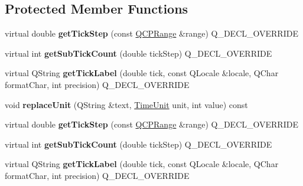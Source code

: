 \subsection*{Protected Member Functions}
\begin{DoxyCompactItemize}
\item 
virtual double {\bfseries get\+Tick\+Step} (const \hyperlink{class_q_c_p_range}{Q\+C\+P\+Range} \&range) Q\+\_\+\+D\+E\+C\+L\+\_\+\+O\+V\+E\+R\+R\+I\+DE\hypertarget{class_q_c_p_axis_ticker_time_a5615064642090fe193797caea8b98cb4}{}\label{class_q_c_p_axis_ticker_time_a5615064642090fe193797caea8b98cb4}

\item 
virtual int {\bfseries get\+Sub\+Tick\+Count} (double tick\+Step) Q\+\_\+\+D\+E\+C\+L\+\_\+\+O\+V\+E\+R\+R\+I\+DE\hypertarget{class_q_c_p_axis_ticker_time_acace84c46598176aa53837e147595471}{}\label{class_q_c_p_axis_ticker_time_acace84c46598176aa53837e147595471}

\item 
virtual Q\+String {\bfseries get\+Tick\+Label} (double tick, const Q\+Locale \&locale, Q\+Char format\+Char, int precision) Q\+\_\+\+D\+E\+C\+L\+\_\+\+O\+V\+E\+R\+R\+I\+DE\hypertarget{class_q_c_p_axis_ticker_time_a046eb771bdf2a959f570db542b3a0be6}{}\label{class_q_c_p_axis_ticker_time_a046eb771bdf2a959f570db542b3a0be6}

\item 
void {\bfseries replace\+Unit} (Q\+String \&text, \hyperlink{class_q_c_p_axis_ticker_time_a5c48ded8c6d3a1aca9b68219469fea3e}{Time\+Unit} unit, int value) const \hypertarget{class_q_c_p_axis_ticker_time_a71896eb1fd7eafaba911245c048857e1}{}\label{class_q_c_p_axis_ticker_time_a71896eb1fd7eafaba911245c048857e1}

\item 
virtual double {\bfseries get\+Tick\+Step} (const \hyperlink{class_q_c_p_range}{Q\+C\+P\+Range} \&range) Q\+\_\+\+D\+E\+C\+L\+\_\+\+O\+V\+E\+R\+R\+I\+DE\hypertarget{class_q_c_p_axis_ticker_time_a38462cd47fdca21bf6c1938eaad93c0c}{}\label{class_q_c_p_axis_ticker_time_a38462cd47fdca21bf6c1938eaad93c0c}

\item 
virtual int {\bfseries get\+Sub\+Tick\+Count} (double tick\+Step) Q\+\_\+\+D\+E\+C\+L\+\_\+\+O\+V\+E\+R\+R\+I\+DE\hypertarget{class_q_c_p_axis_ticker_time_a08b898076e82b8ee6adcc027e1db92a7}{}\label{class_q_c_p_axis_ticker_time_a08b898076e82b8ee6adcc027e1db92a7}

\item 
virtual Q\+String {\bfseries get\+Tick\+Label} (double tick, const Q\+Locale \&locale, Q\+Char format\+Char, int precision) Q\+\_\+\+D\+E\+C\+L\+\_\+\+O\+V\+E\+R\+R\+I\+DE\hypertarget{class_q_c_p_axis_ticker_time_a684c762479ac38be7c3cf9b378883147}{}\label{class_q_c_p_axis_ticker_time_a684c762479ac38be7c3cf9b378883147}


\end{DoxyCompactItemize}

